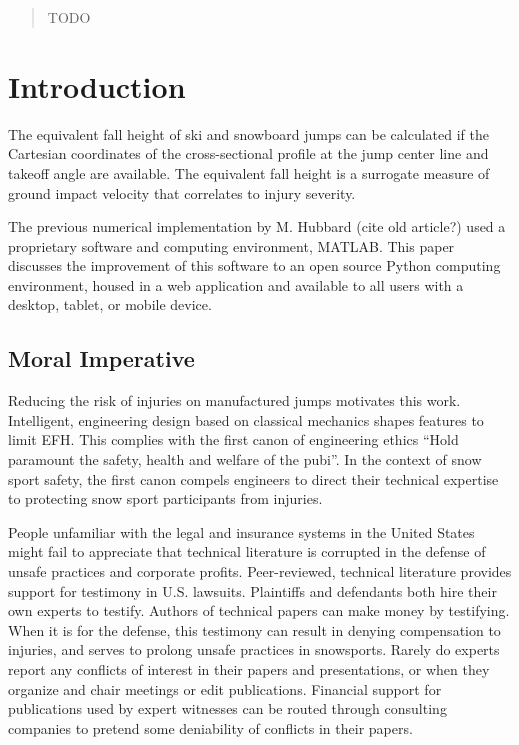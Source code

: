 \documentclass{article}
\begin{document}
\begin{abstract}
    TODO
\end{abstract}

\section{Introduction}
%
The equivalent fall height of ski and snowboard jumps can be calculated if the Cartesian coordinates of the cross-sectional profile at the jump center line and takeoff angle are available. The equivalent fall height is a surrogate measure of ground impact velocity that correlates to injury severity.

The previous numerical implementation by M. Hubbard (cite old article?) used a proprietary software and computing environment, MATLAB. This paper discusses the improvement of this software to an open source Python computing environment, housed in a web application and available to all users with a desktop, tablet, or mobile device.

\subsection{Moral Imperative}
%
Reducing the risk of injuries on manufactured jumps motivates this work. Intelligent, engineering design based on classical mechanics shapes features to limit EFH. This complies with the first canon of engineering ethics ``Hold paramount the safety, health and welfare of the pubi''. In the context of snow sport safety, the first canon compels engineers to direct their technical expertise to protecting snow sport participants from injuries. 

People unfamiliar with the legal and insurance systems in the United States might fail to appreciate that technical literature is corrupted in the defense of unsafe practices and corporate profits. Peer-reviewed, technical literature provides support for testimony in U.S. lawsuits. Plaintiffs and defendants both hire their own experts to testify. Authors of technical papers can make money by testifying. When it is for the defense, this testimony can result in denying compensation to injuries, and serves to prolong unsafe practices in snowsports. Rarely do experts report any conflicts of interest in their papers and presentations, or when they organize and chair meetings or edit publications. Financial support for publications used by expert witnesses can be routed through consulting companies to pretend some deniability of conflicts in their papers.  
\end{document}
